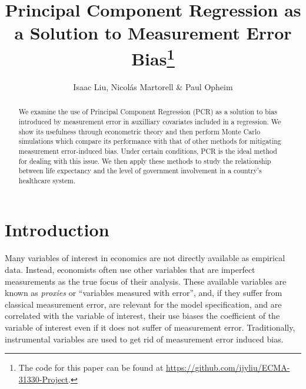 \documentclass[10pt]{article}
\begin{document}
    \thispagestyle{firststyle}

    \title{Principal Component Regression as a Solution to Measurement Error Bias\thanks{The code for this paper can be found at \url{https://github.com/ijyliu/ECMA-31330-Project}.}} 
    \author{Isaac Liu, Nicol\'as Martorell \& Paul Opheim}
    \maketitle



    \begin{abstract}

        We examine the use of Principal Component Regression (PCR) as a solution to bias introduced by measurement error in auxilliary covariates included in a regression. We show its usefulness through econometric theory and then perform Monte Carlo simulations which compare its performance with that of other methods for mitigating measurement error-induced bias. Under certain conditions, PCR is the ideal method for dealing with this issue. We then apply these methods to study the relationship between life expectancy and the level of government involvement in a country's healthcare system.
        
    \end{abstract}

    \newpage \clearpage

    \section*{Introduction}

        Many variables of interest in economics are not directly available as empirical data. Instead, economists often use other variables that are imperfect measurements as the true focus of their analysis. These available variables are known as \textit{proxies} or ``variables measured with error'', and, if they suffer from classical measurement error, are relevant for the model specification, and are correlated with the variable of interest, their use biases the coefficient of the variable of interest even if it does not suffer of measurement error. Traditionally, instrumental variables are used to get rid of measurement error induced bias.
\end{document}
